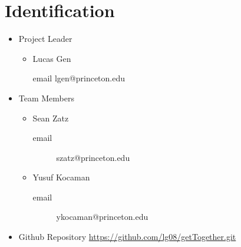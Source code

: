 \documentclass[11pt]{article}
\author{Lucas Gen}
\date{\today}
\title{}
\begin{document}
\tableofcontents

\section{Identification}
\label{sec:org6f3828d}
\begin{itemize}
\item Project Leader
\begin{itemize}
\item Lucas Gen
\item[{email}] lgen@princeton.edu
\end{itemize}
\item Team Members
\begin{itemize}
\item Sean Zatz
\begin{description}
\item[{email}] szatz@princeton.edu
\end{description}
\item Yusuf Kocaman
\begin{description}
\item[{email}] ykocaman@princeton.edu
\end{description}
\end{itemize}
\item Github Repository  \url{https://github.com/lg08/getTogether.git}
\end{itemize}
\end{document}

